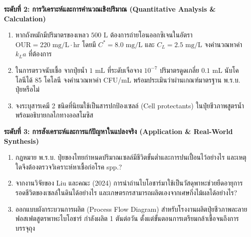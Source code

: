 \noindent \textbf{ระดับที่ 2: การวิเคราะห์และการคำนวณเชิงปริมาณ (Quantitative Analysis \& Calculation)}
\begin{enumerate}[resume]
    \item หากถังหมักมีปริมาตรของเหลว $500\text{ L}$ ต้องการถ่ายโอนออกซิเจนในอัตรา $\text{OUR} = 220\text{ mg/L}\cdot\text{hr}$ โดยมี $C^* = 8.0\text{ mg/L}$ และ $C_L = 2.5\text{ mg/L}$ จงคำนวณหาค่า $k_L a$ ที่ต้องการ
    \item ในการตรวจนับเชื้อ  จากปุ๋ยน้ำ $1\text{ mL}$ ที่ระดับเจือจาง $10^{-7}$ ปริมาตรดูดเกลี่ย $0.1\text{ mL}$ นับโคโลนีได้ 85 โคโลนี จงคำนวณหาค่า CFU/mL พร้อมประเมินว่าผ่านเกณฑ์มาตรฐาน พ.ร.บ. ปุ๋ยหรือไม่
    \item จงระบุสารเคมี 2 ชนิดที่นิยมใช้เป็นสารปกป้องเซลล์ (Cell protectants) ในปุ๋ยชีวภาพสูตรน้ำ พร้อมอธิบายกลไกทางออสโมซิส
\end{enumerate}

\noindent \textbf{ระดับที่ 3: การสังเคราะห์และการแก้ปัญหาในแปลงจริง (Application \& Real-World Synthesis)}
\begin{enumerate}[resume]
    \item กฎหมาย พ.ร.บ. ปุ๋ยของไทยกำหนดปริมาณเซลล์มีชีวิตขั้นต่ำและการปนเปื้อนไว้อย่างไร และเหตุใดจึงต้องตรวจวิเคราะห์หาเชื้อก่อโรค  spp.?
    \item จากงานวิจัยของ Liu และคณะ (2024) การนำถ่านไบโอชาร์มาใช้เป็นวัสดุพาหะช่วยยืดอายุการรอดชีวิตของเซลล์ในดินได้อย่างไร และเกษตรกรสามารถผลิตเองจากเศษกิ่งไม้ผลได้อย่างไร?
    \item ออกแบบผังกระบวนการผลิต (Process Flow Diagram) สำหรับโรงงานผลิตปุ๋ยชีวภาพละลายฟอสเฟตสูตรพาหะไบโอชาร์ กำลังผลิต 1 ตันต่อวัน ตั้งแต่ขั้นตอนการเตรียมกล้าเชื้อจนถึงการบรรจุถุง
\end{enumerate}
